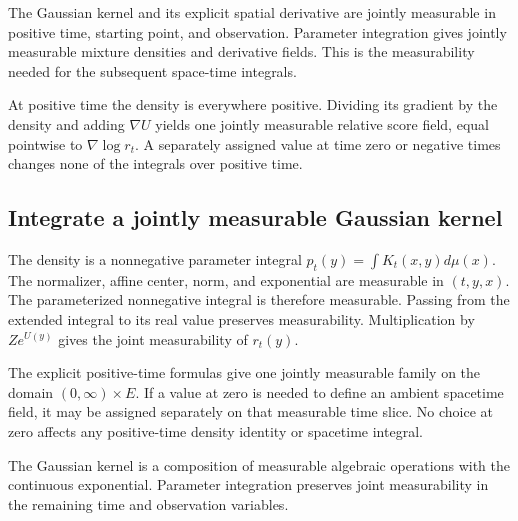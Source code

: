 \documentclass[11pt,a4paper]{report}
\begin{document}
The Gaussian kernel and its explicit spatial derivative are jointly measurable in positive time, starting point, and observation. Parameter integration gives jointly measurable mixture densities and derivative fields. This is the measurability needed for the subsequent space-time integrals.



At positive time the density is everywhere positive. Dividing its gradient by the density and adding \(\nabla U\) yields one jointly measurable relative score field, equal pointwise to \(\nabla\log r_t\). A separately assigned value at time zero or negative times changes none of the integrals over positive time.

\subsection{\texorpdfstring{Integrate a jointly measurable Gaussian kernel}{Integrate a jointly measurable Gaussian kernel}}
\label{report-step-UnadjustedLangevin-LSI-GaussianMeasurability-lean-1}


The density is a nonnegative parameter integral \(p_t(y)=\int K_t(x,y)d\mu(x)\). The normalizer, affine center, norm, and exponential are measurable in \((t,y,x)\). The parameterized nonnegative integral is therefore measurable. Passing from the extended integral to its real value preserves measurability. Multiplication by \(Z e^{U(y)}\) gives the joint measurability of \(r_t(y)\).



The explicit positive-time formulas give one jointly measurable family on the domain \((0,\infty)\times E\). If a value at zero is needed to define an ambient spacetime field, it may be assigned separately on that measurable time slice. No choice at zero affects any positive-time density identity or spacetime integral.



The Gaussian kernel is a composition of measurable algebraic operations with the continuous exponential. Parameter integration preserves joint measurability in the remaining time and observation variables.
\end{document}
